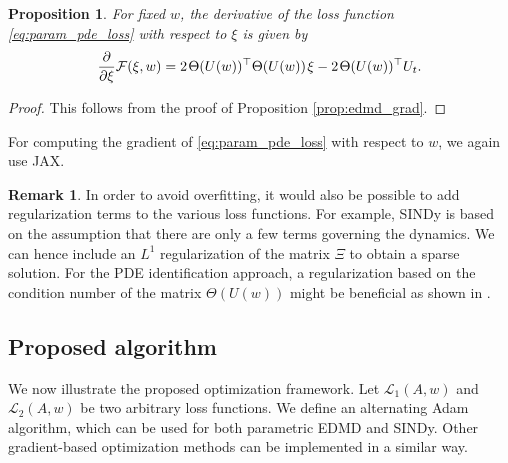 \documentclass
[
    a4paper,
    DIV=11,
    abstract=true,
    11pt,
]
{scrartcl}
\newcommand{\ts}{\hspace*{0.1em}}                                %
\newtheorem{proposition}[theorem]{Proposition}
\theoremstyle{definition}
\newtheorem{remark}[theorem]{Remark}
\begin{document}
\begin{proposition}
For fixed $w$, the derivative of the loss function \eqref{eq:param_pde_loss} with respect to $ \xi $ is given by
\begin{equation*}
    \frac{\partial}{\partial \xi} \mathcal{F}(\xi, w) = 2 \ts \Theta(U(w))^\top \Theta(U(w)) \ts \xi - 2 \ts \Theta(U(w))^\top U_t.
\end{equation*}
\end{proposition}
\begin{proof}
This follows from the proof of Proposition \ref{prop:edmd_grad}.
\end{proof}

For computing the gradient of \eqref{eq:param_pde_loss} with respect to $w$, we again use JAX.

\begin{remark}
In order to avoid overfitting, it would also be possible to add regularization terms to the various loss functions. For example, SINDy is based on the assumption that there are only a few terms governing the dynamics. We can hence include an $L^1$ regularization of the matrix $\Xi$ to obtain a sparse solution. For the PDE identification approach, a regularization based on the condition number of the matrix $\Theta(U(w))$ might be beneficial as shown in \cite{rudy2017data}.
\end{remark}

\subsection{Proposed algorithm}

We now illustrate the proposed optimization framework. Let $\mathcal{L}_1(A, w)$ and $\mathcal{L}_2(A, w)$ be two arbitrary loss functions. We define an alternating Adam algorithm, which can be used for both parametric EDMD and SINDy. Other gradient-based optimization methods can be implemented in a similar way.
\end{document}
